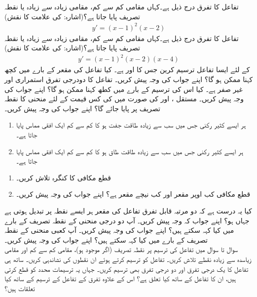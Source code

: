 تفاعل  کا تفرق درج ذیل ہے۔کہاں مقامی کم سے کم، مقامی زیادہ سے زیادہ یا  نقطہ تصریف پایا جاتا ہے؟(اشارہ:  کی علامت کا نقش) 
\begin{align*}
y'=(x-1)^2(x-2)
\end{align*}
تفاعل  کا تفرق درج ذیل ہے۔کہاں مقامی کم سے کم، مقامی زیادہ سے زیادہ یا  نقطہ تصریف پایا جاتا ہے؟(اشارہ:  کی علامت کا نقش) 
\begin{align*}
y'=(x-1)^2(x-2)(x-4)
\end{align*}
 کے لئے ایسا تفاعل  ترسیم کرین جس کا  اور  ہے۔ کیا تفاعل کی مقعر کے بارے میں کچھ کہنا ممکن ہو گا؟ اپنے جواب کی وجہ پیش کریں۔
تفاعل  کا دودرجی تفرق استمراری اور غیر صفر ہے۔ کیا اس کی ترسیم کے بارے میں کطھ کہنا ممکن ہو گا؟ اپنے جواب کی وجہ پیش کریں۔
مستقل ،  اور  کی صورت میں  کی کس قیمت کے لئے منحنی  کا نقطہ تصریف  پر پایا جائے گا؟ اپنے جواب کی وجہ پیش کریں۔
\begin{enumerate}
\item
ہر ایسے کثیر رکنی جس میں سب سے زیادہ طاقت جفت ہو  کا کم سے کم ایک افقی مماس پایا جاتا ہے۔
\item
ہر ایسے کثیر رکنی جس میں سب سے زیادہ طاقت طاق ہو  کا کم سے کم ایک افقی مماس پایا جاتا ہے۔
\end{enumerate}
\begin{enumerate}
\item
قطع مکافی  کا کنگرہ تلاش کریں۔
\item
قطع مکافی کب اوپر مقعر اور کب  نیچے مقعر ہے؟ اپنے جواب کی وجہ پیش کریں۔
\end{enumerate}
کیا یہ درست ہے کہ دو مرتبہ قابل تفرق تفاعل  کی مقعر ہر ایسے نقطہ پر تبدیل ہوتی ہے جہاں  ہو؟ اپنے جواب کہ وجہ پیش کریں۔
\quad
آپ دو درجی منحنی  کے نقطہ تصریف کے بارے میں کیا کہہ سکتے ہیں؟ اپنے جواب کی وجہ پیش کریں۔
\quad
آپ کعبی منحنی  کے نقطہ تصریف کے بارے میں کیا کہہ سکتے ہیں؟ اپنے جواب کی وجہ پیش کریں۔
\\
سوال  تا سوال  میں تفاعل کی ترسیم پر نقطہ تصریف (اگر موجود ہو)، مقامی کم سے کم اور مقامی زیاسدہ سے زیادہ نقطے  تلاش کریں۔ تفاعل کو ترسیم کرتے ہوئے ان نقطوں کی نشاندہی کریں۔ ساتھ ہی تفاعل کا یک درجی تفرق اور دو درجی تفرق بھی ترسیم کریں۔ جہاں یہ ترسیمات  محدد کو قطع کرتی ہیں، ان کا تفاعل کے ساتھ کیا تعلق ہے؟ اس کے علاوہ تفرق کے تفاعل کے ترسیم کے ساتھ کیا تعلقات ہیں؟ 

